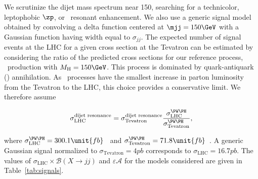 
We scrutinize the dijet mass spectrum near 150\GeV, searching for a
technicolor, leptophobic $\zp$, or \PW\PH\ resonant enhancement.  We also
use a generic signal model obtained by convolving a delta function
centered at $\mjj=150\GeV$ with a Gaussian function having width equal
to $\sigma_{jj}$.  The expected number of signal events at the LHC 
for a given cross section at the Tevatron can be
estimated by considering the ratio of the predicted cross sections for
our reference process, \PW\PH\ production with $M_{\text{H}} = 150\GeV$.
This process is dominated by quark-antiquark (\cPq\cPaq) annihilation.
As \cPq\cPaq\ processes have the smallest increase in parton
luminosity from the Tevatron to the LHC, this choice provides a
conservative limit.  We therefore assume
\begin{linenomath}
\begin{equation}
\sigma_{\text{LHC}}^{\text{dijet resonance}} = 
\sigma_{\text{Tevatron}}^{\text{dijet resonance}}  
\frac{\sigma_{\text{LHC}}^{\PW\PH}}{\sigma_{\text{Tevatron}}^{\PW\PH}},\label{eqTevToLHC2}\nonumber
\end{equation}
\end{linenomath}
where $\sigma_{\text{LHC}}^{\PW\PH} =
300.1\unit{fb}$~\cite{LHC4PDFxsec} and
$\sigma_{\text{Tevatron}}^{\PW\PH} =
71.8\unit{fb}$~\cite{Carena:2000yx}.  A generic Gaussian signal
normalized to $\sigma_{\text{Tevatron}} = 4\unit{pb}$ corresponds to
$\sigma_{\text{LHC}} = 16.7\unit{pb}$.  The values of
$\sigma_{\text{LHC}}\times \mathcal{B}(X\rightarrow jj)$ and
$\varepsilon\mathcal{A}$ for the models considered are given in
Table~\ref{tab:signals}.


